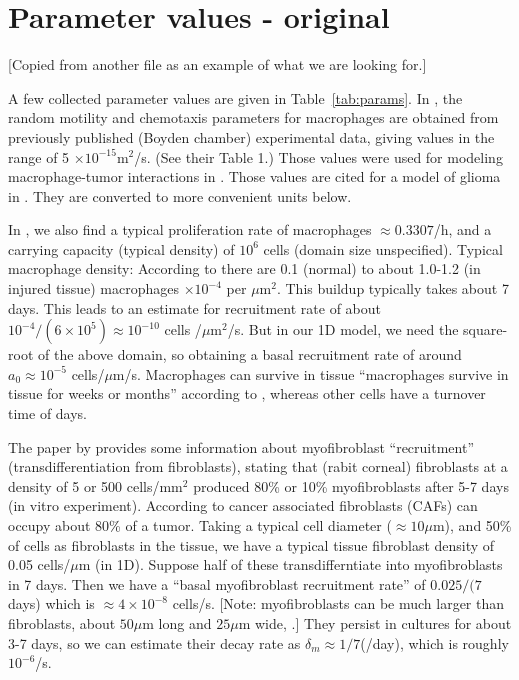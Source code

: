 \newpage 
\section*{Parameter values - original}
[Copied from another file as an example of what we are looking for.]

A few collected parameter values are given in Table~\ref{tab:params}. In \cite{owen1997pattern}, the random motility and chemotaxis parameters for macrophages are obtained from previously published (Boyden chamber)  experimental data, giving values in the range of 5 $\times 10^{-15}$m$^2$/s. (See their Table 1.) Those values were used for modeling macrophage-tumor interactions in \cite{owen1997pattern}. Those values are cited for a model of glioma in \cite{khajanchi2021spatiotemporal}. They are converted to more convenient units below.

In \cite{khajanchi2021spatiotemporal}, we also find a typical proliferation rate of macrophages $\approx 0.3307$/h, and a carrying capacity (typical density) of  $10^6$ cells (domain size unspecified). Typical macrophage density: According to \cite{gupta2006spatiotemporal} there are 0.1 (normal) to about 1.0-1.2 (in injured tissue)  macrophages $\times 10^{-4}$ per $\mu$m$^2$. This buildup typically takes about 7 days. This leads to an estimate for recruitment rate of about $10^{-4}/(6\times 10^5) \approx 10^{-10}$ cells /$\mu$m$^2$/s. But in our 1D model, we need the square-root of the above domain, so obtaining a basal recruitment rate of around $a_0\approx 10^{-5}$ cells/$\mu$m/s.
Macrophages can survive in tissue ``macrophages survive in tissue for weeks or months'' according to \cite{owen1997pattern}, whereas other cells have a turnover time of days.


The paper by \cite{masur1996myofibroblasts} provides some information about myofibroblast ``recruitment'' (transdifferentiation from fibroblasts), stating that (rabit corneal) fibroblasts at a density of 5 or 500 cells/mm$^2$ produced 80\% or 10\% myofibroblasts after 5-7 days (in vitro experiment). According to \cite{gascard2016carcinoma} cancer associated fibroblasts (CAFs) can occupy about 80\% of a tumor. Taking a typical cell diameter ($\approx 10\mu$m), and 50\% of cells as fibroblasts in the tissue, we have a typical tissue fibroblast density of 0.05 cells/$\mu$m (in 1D). Suppose half of these transdifferntiate into myofibroblasts in 7 days. Then we have a ``basal myofibroblast recruitment rate'' of  $0.025/(7$ days) which is $\approx 4 \times 10^{-8}$ cells/s. [Note: myofibroblasts can be much larger than fibroblasts, about $50\mu$m long and $25\mu$m wide, \cite{masur1996myofibroblasts}.] They persist in cultures for about 3-7 days, so we can estimate their decay rate as $\delta_m\approx 1/7$(/day), which is roughly $10^{-6}$/s.

